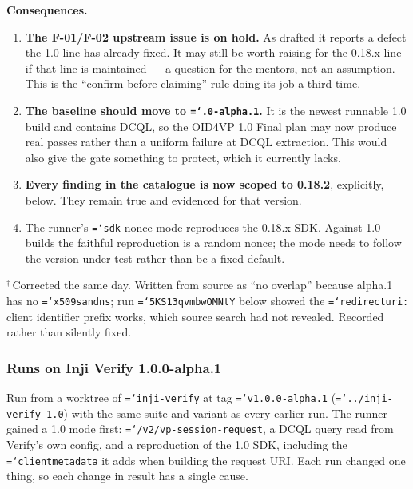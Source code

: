 \documentclass[11pt,a4paper]{article}
\newcommand{\tightlist}{\setlength{\itemsep}{0pt}\setlength{\parskip}{0pt}\setlength{\parsep}{0pt}}
\let\origtexttt\texttt
\renewcommand{\texttt}[1]{\origtexttt{\hyphenchar\font=`\-\relax #1}}
\renewcommand{\_}{\textunderscore\allowbreak}
\begin{document}
\textbf{Consequences.}
\begin{enumerate}\tightlist
  \item \textbf{The F-01/F-02 upstream issue is on hold.} As drafted it reports a defect the 1.0
        line has already fixed. It may still be worth raising for the 0.18.x line if that line
        is maintained --- a question for the mentors, not an assumption. This is the
        ``confirm before claiming'' rule doing its job a third time.
  \item \textbf{The baseline should move to \texttt{1.0.0-alpha.1}.} It is the newest runnable 1.0
        build and contains DCQL, so the OID4VP 1.0 Final plan may now produce real passes rather
        than a uniform failure at DCQL extraction. This would also give the gate something to
        protect, which it currently lacks.
  \item \textbf{Every finding in the catalogue is now scoped to 0.18.2}, explicitly, below.
        They remain true and evidenced for that version.
  \item The runner's \texttt{sdk} nonce mode reproduces the 0.18.x SDK. Against 1.0 builds
        the faithful reproduction is a random nonce; the mode needs to follow the version
        under test rather than be a fixed default.
\end{enumerate}

$^\dagger$\,Corrected the same day. Written from source as ``no overlap'' because alpha.1 has no
\texttt{x509\_san\_dns}; run \texttt{5KS13qvmbwOMNtY} below showed the \texttt{redirect\_uri:}
client identifier prefix works, which source search had not revealed. Recorded rather than
silently fixed.

\subsubsection*{Runs on Inji Verify 1.0.0-alpha.1}

Run from a worktree of \texttt{inji-verify} at tag \texttt{v1.0.0-alpha.1}
(\texttt{../inji-verify-1.0}) with the same suite and variant as every earlier run. The runner
gained a 1.0 mode first: \texttt{/v2/vp-session-request}, a DCQL query read from Verify's own
config, and a reproduction of the 1.0 SDK, including the \texttt{client\_metadata} it adds
when building the request URI. Each run changed one thing, so each change in result has a
single cause.
\end{document}
